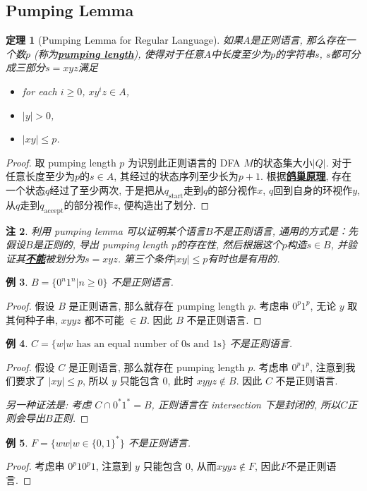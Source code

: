 \documentclass[8pt]{article}
\theoremstyle{compact}
\newtheorem{theorem}{定理}[section]
\newtheorem{example}[theorem]{例}
\newtheorem{remark}[theorem]{注}
\def\obj#1{\textbf{\uline{#1}}}
\def\le{\leqslant}
\def\ge{\geqslant}
\begin{document}
\subsection{Pumping Lemma}
\begin{theorem}[Pumping Lemma for Regular Language]
	如果$A$是正则语言, 那么存在一个数$p$ (称为\obj{pumping length}), 使得对于任意$A$中长度至少为$p$的字符串$s$, $s$都可分成三部分$s = xyz$满足
	\begin{itemize}
		\item for each $i \ge 0$, $xy^iz \in A$,
		\item $|y| > 0$,
		\item $|xy| \le p$.
	\end{itemize}
\end{theorem}
\begin{proof}
	取 pumping length $p$ 为识别此正则语言的 DFA $M$的状态集大小$|Q|$. 对于任意长度至少为$p$的$s \in A$, 其经过的状态序列至少长为$p+1$. 根据\obj{鸽巢原理}, 存在一个状态$q$经过了至少两次, 于是把从$q_{\text{start}}$走到$q$的部分视作$x$, $q$回到自身的环视作$y$, 从$q$走到$q_{\text{accept}}$的部分视作$z$, 便构造出了划分. 
\end{proof}
\begin{remark}
	利用 pumping lemma 可以证明某个语言$B$不是正则语言, 通用的方式是：先假设$B$是正则的, 导出 pumping length $p$的存在性, 然后根据这个$p$构造$s \in B$, 并验证其\obj{不能}被划分为$s = xyz$. 第三个条件$|xy| \le p$有时也是有用的. 
\end{remark}
\begin{example}
	$B = \{0^n1^n | n \ge 0\}$ 不是正则语言.
\end{example}
\begin{proof}
	假设 $B$ 是正则语言, 那么就存在 pumping length $p$. 考虑串 $0^p1^p$, 无论 $y$ 取其何种子串, $xyyz$ 都不可能 $\in B$. 因此 $B$ 不是正则语言.
\end{proof}
\begin{example}
	$C = \{w | w \text{ has an equal number of 0s and 1s}\}$ 不是正则语言.
\end{example}
\begin{proof}
	假设 $C$ 是正则语言, 那么就存在 pumping length $p$. 考虑串 $0^p1^p$, 注意到我们要求了 $|xy| \le p$, 所以 $y$ 只能包含 $0$, 此时 $xyyz \notin B$. 因此 $C$ 不是正则语言.
	
	\textit{另一种证法是: 考虑 $C \cap 0^*1^* = B$, 正则语言在 intersection 下是封闭的, 所以$C$正则会导出$B$正则.}
\end{proof}
\begin{example}
	$F = \{ww | w \in \{0, 1\}^*\}$ 不是正则语言.
\end{example}
\begin{proof}
	考虑串 $0^p10^p1$, 注意到 $y$ 只能包含 $0$, 从而$xyyz \notin F$, 因此$F$不是正则语言.
\end{proof}
\end{document}
